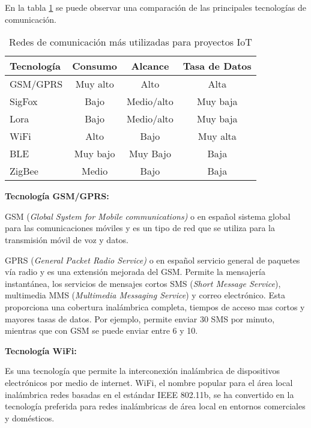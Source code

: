 En la tabla \ref{tab:Tecno} se puede observar una comparación de las principales tecnologías de comunicación.

\begin{table}[h]
	\centering
	\caption[Redes de comunicación]{Redes de comunicación más utilizadas para proyectos IoT}
	\begin{tabular}{l c c c}    
		\toprule
		\textbf{Tecnología} 	 & \textbf{Consumo}  & \textbf{Alcance} 	& \textbf{Tasa de Datos} \\
		\midrule
		GSM/GPRS				 & Muy alto			& Alto					&	Alta \\		
		SigFox					 & Bajo				& Medio/alto			&	Muy baja \\
		Lora					 & Bajo				& Medio/alto			&	Muy baja\\	
		WiFi					 & Alto				& Bajo					&	Muy alta \\
		BLE					 	 & Muy bajo			& Muy Bajo				&	Baja \\
		ZigBee					 & Medio			& Bajo					&	Baja \\	
		\bottomrule
		\hline
	\end{tabular}
	\label{tab:Tecno}
\end{table}

\textbf{Tecnología GSM/GPRS:}

GSM (\textit{Global System for Mobile communications)} o en español sistema global para las comunicaciones móviles y es un tipo de red que se utiliza para la transmisión móvil de voz y datos.

GPRS (\textit{General Packet Radio Service)} o en español servicio general de paquetes vía radio y es una extensión mejorada del GSM.
Permite la mensajería instantánea, los servicios de mensajes cortos SMS (\textit{Short Message Service}), multimedia MMS (\textit{Multimedia Messaging Service}) y correo electrónico. Esta proporciona una cobertura inalámbrica completa, tiempos de acceso mas cortos y mayores tasas de datos\citep{bettstetter1999gsm}. Por ejemplo, permite enviar 30 SMS por minuto, mientras que con GSM se puede enviar entre 6 y 10.

\textbf{Tecnología WiFi:}

Es una tecnología que permite la interconexión inalámbrica de dispositivos electrónicos por medio de internet. WiFi, el nombre popular para el área local inalámbrica redes basadas en el estándar IEEE 802.11b, se ha convertido en la tecnología preferida para redes inalámbricas de área local en entornos comerciales y domésticos\citep{henry2002wifi}.

